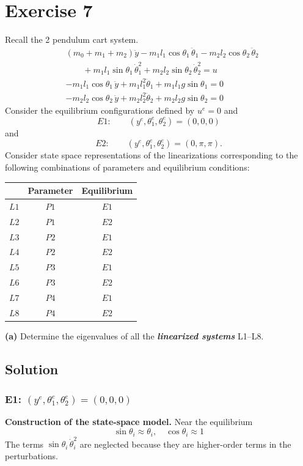 \documentclass[12pt,a4paper]{article}
\begin{document}
\section*{Exercise 7}
Recall the 2 pendulum cart system.
\begin{align*}
&(m_0+m_1+m_2)\ddot{y}-m_1l_1\cos\theta_1\,\ddot{\theta}_1-m_2l_2\cos\theta_2\,\ddot{\theta}_2\\
&\qquad{}+m_1l_1\sin\theta_1\,\dot{\theta}_1^2+m_2l_2\sin\theta_2\,\dot{\theta}_2^2=u\\
&-m_1l_1\cos\theta_1\,\ddot{y}+m_1l_1^2\ddot{\theta}_1+m_1l_1g\sin\theta_1=0\\
&-m_2l_2\cos\theta_2\,\ddot{y}+m_2l_2^2\ddot{\theta}_2+m_2l_2g\sin\theta_2=0
\end{align*}
Consider the equilibrium configurations defined by $u^e=0$ and
\[E1:\qquad(y^e,\theta_1^e,\theta_2^e)=(0,0,0)\]
and
\[E2:\qquad(y^e,\theta_1^e,\theta_2^e)=(0,\pi,\pi).\]
Consider state space representations of the linearizations corresponding to the following combinations of parameters and equilibrium conditions:
\begin{center}
\begin{tabular}{c|c|c}
 & Parameter & Equilibrium\\\hline
$L1$ & $P1$ & $E1$\\
$L2$ & $P1$ & $E2$\\
$L3$ & $P2$ & $E1$\\
$L4$ & $P2$ & $E2$\\
$L5$ & $P3$ & $E1$\\
$L6$ & $P3$ & $E2$\\
$L7$ & $P4$ & $E1$\\
$L8$ & $P4$ & $E2$
\end{tabular}
\end{center}

\textbf{(a)} Determine the eigenvalues of all the \textbf{\textit{linearized systems}} L1--L8.
\subsection*{Solution}

\subsubsection*{E1: $(y^e,\theta_1^e,\theta_2^e)=(0,0,0)$}
\textbf{Construction of the state-space model.}
Near the equilibrium
\[
\sin \theta_i \approx \theta_i, \quad \cos\theta_i \approx 1
\]
The terms $\sin\theta_i\,\dot\theta_i^2$ are neglected because they are higher-order terms in the perturbations.
\end{document}
